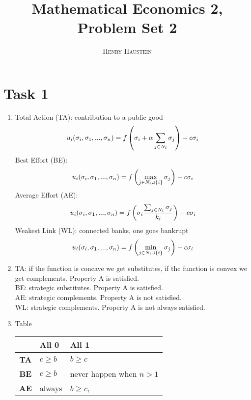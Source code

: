 \documentclass{article}
\title{\textbf{Mathematical Economics 2, Problem Set 2}}
\author{\textsc{Henry Haustein}}
\date{}
\begin{document}
	\maketitle
	
	\section*{Task 1}
	\begin{enumerate}[label=(\alph*)]
		\item Total Action (TA): contribution to a public good
		\begin{align}
			u_i(\sigma_i, \sigma_1, ..., \sigma_n) = f\left(\sigma_i + \alpha\sum_{j\in N_i} \sigma_j\right) - c\sigma_i\notag
		\end{align}
		Best Effort (BE):
		\begin{align}
			u_i(\sigma_i, \sigma_1, ..., \sigma_n) = f\left(\max_{j\in N_i\cup \{i\}} \sigma_j\right) - c\sigma_i \notag
		\end{align}
		Average Effort (AE):
		\begin{align}
			u_i(\sigma_i, \sigma_1, ..., \sigma_n) = f\left(\sigma_i\frac{\sum_{j\in N_i} \sigma_j}{k_i}\right) - c\sigma_i \notag
		\end{align}
		Weakest Link (WL): connected banks, one goes bankrupt
		\begin{align}
			u_i(\sigma_i, \sigma_1, ..., \sigma_n) = f\left(\min_{j\in N_i\cup \{i\}} \sigma_j\right) - c\sigma_i \notag
		\end{align}
		\item TA: if the function is concave we get substitutes, if the function is convex we get complements. Property A is satisfied. \\
		BE: strategic substitutes. Property A is satisfied. \\
		AE: strategic complements. Property A is not satisfied. \\
		WL: strategic complements. Property A is not always satisfied.
		\item Table
		\begin{center}
			\begin{tabular}{c|C{5cm}|C{5cm}}
				& \textbf{All 0} & \textbf{All 1} \\
				\hline
				\textbf{TA} & $c\ge b$ & $b\ge c$ \\
				\hline
				\textbf{BE} & $c\ge b$ & never happen when $n>1$ \\
				\hline
				\textbf{AE} & always & $b\ge c$,  \\

\end{tabular}
\end{center}
\end{enumerate}
\end{document}
